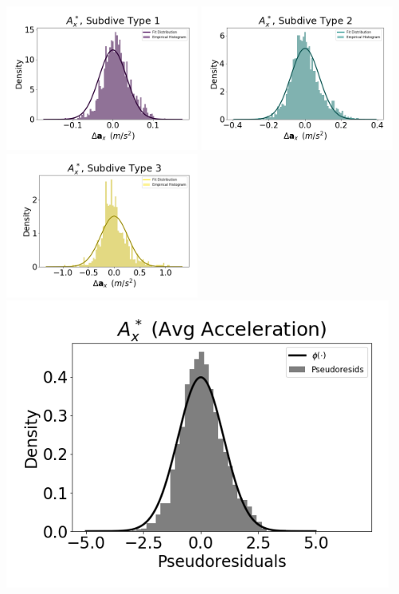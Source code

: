 \documentclass[12pt]{TD-CJS}
\begin{document}
\includegraphics[width=2.5in]{../Plots/CarHHMM2_empirical_hist_Ax_0.png}
\includegraphics[width=2.5in]{../Plots/CarHHMM2_empirical_hist_Ax_1.png}
\includegraphics[width=2.5in]{../Plots/CarHHMM2_empirical_hist_Ax_2.png}
\includegraphics[width=5in]{../Plots/CarHHMM2_psedoresids_Ax.png}
\end{document}
